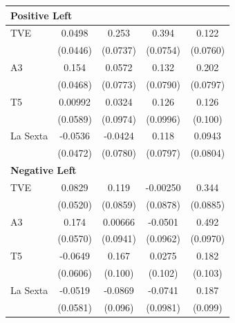 \documentclass[12pt]{article}
\begin{document}
\begin{table}[htbp]
\begin{tabular}{lcccc}
	\multicolumn{5}{l}{\textbf{Positive Left}}\\
	\hline
	TVE       & 0.0498        & 0.253\sym{***}& 0.394\sym{***}& 0.122         \\
	& (0.0446)      & (0.0737)      & (0.0754)      & (0.0760)      \\
	A3        & 0.154\sym{**} & 0.0572        & 0.132         & 0.202\sym{*}  \\
	& (0.0468)      & (0.0773)      & (0.0790)      & (0.0797)      \\
	T5        & 0.00992       & 0.0324        & 0.126         & 0.126         \\
	& (0.0589)      & (0.0974)      & (0.0996)      & (0.100)       \\
	La Sexta  & -0.0536       & -0.0424       & 0.118         & 0.0943        \\
	& (0.0472)      & (0.0780)      & (0.0797)      & (0.0804)      \\
	\hline
	
	\multicolumn{5}{l}{\textbf{Negative Left}}\\
	\hline
	TVE       & 0.0829        & 0.119         & -0.00250      & 0.344\sym{***}\\
	& (0.0520)      & (0.0859)      & (0.0878)      & (0.0885)      \\
	A3        & 0.174\sym{**} & 0.00666       & -0.0501       & 0.492\sym{***}\\
	& (0.0570)      & (0.0941)      & (0.0962)      & (0.0970)      \\
	T5        & -0.0649       & 0.167\sym{*}  & 0.0275        & 0.182\sym{*}  \\
	& (0.0606)      & (0.100)       & (0.102)       & (0.103)       \\
	La Sexta  & -0.0519       & -0.0869       & -0.0741       & 0.187\sym{*}  \\
	& (0.0581)      & (0.096)       & (0.0981)      & (0.099)       \\
	\hline
	

\end{tabular}
\end{table}
\end{document}
